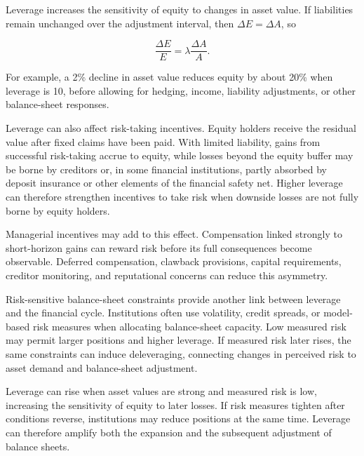 Leverage increases the sensitivity of equity to changes in asset value. If liabilities remain unchanged over the adjustment interval, then \(\Delta E=\Delta A\), so

\begin{equation}
\frac{\Delta E}{E}
=\lambda
\frac{\Delta A}{A}.
\label{eq:ch21-leverage-amplification}
\end{equation}

For example, a 2\% decline in asset value reduces equity by about 20\% when leverage is 10, before allowing for hedging, income, liability adjustments, or other balance-sheet responses.

Leverage can also affect risk-taking incentives. Equity holders receive the residual value after fixed claims have been paid. With limited liability, gains from successful risk-taking accrue to equity, while losses beyond the equity buffer may be borne by creditors or, in some financial institutions, partly absorbed by deposit insurance or other elements of the financial safety net. Higher leverage can therefore strengthen incentives to take risk when downside losses are not fully borne by equity holders.

Managerial incentives may add to this effect. Compensation linked strongly to short-horizon gains can reward risk before its full consequences become observable. Deferred compensation, clawback provisions, capital requirements, creditor monitoring, and reputational concerns can reduce this asymmetry.

Risk-sensitive balance-sheet constraints provide another link between leverage and the financial cycle. Institutions often use volatility, credit spreads, or model-based risk measures when allocating balance-sheet capacity. Low measured risk may permit larger positions and higher leverage. If measured risk later rises, the same constraints can induce deleveraging, connecting changes in perceived risk to asset demand and balance-sheet adjustment.
\begin{tcolorbox}[
  enhanced,
  breakable,
  colback=white,
  colframe=FinanceBlue,
  boxrule=0.7pt,
  sharp corners,
  borderline west={2.2pt}{0pt}{FinanceBlue},
  title=\textbf{Financial Perspective: Leverage Can Be Procyclical},
  coltitle=white,
  colbacktitle=FinanceBlue,
  fonttitle=\bfseries,
  before skip=1.2em,
  after skip=1.2em
]

Leverage can rise when asset values are strong and measured risk is low, increasing the sensitivity of equity to later losses. If risk measures tighten after conditions reverse, institutions may reduce positions at the same time. Leverage can therefore amplify both the expansion and the subsequent adjustment of balance sheets.

\end{tcolorbox}

